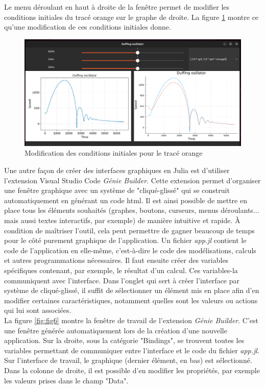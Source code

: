 \documentclass[a4paper, french, 12pt, titlepage]{article}
\begin{document}
Le menu déroulant en haut à droite de la fenêtre permet de modifier les conditions initiales du tracé orange sur le graphe de droite. 
La figure \ref{fig:fig5} montre ce qu'une modification de ces conditions initiales donne. \\

\begin{figure}[H]
  \includegraphics[width=\linewidth]{interactivewindow_4.png}
  \caption{Modification des conditions initiales pour le tracé orange}
  \label{fig:fig5}
\end{figure}

Une autre façon de créer des interfaces graphiques en Julia est d'utiliser l'extension Visual Studio Code \emph{Génie Builder}. 
Cette extension permet d'organiser une fenêtre graphique avec un système de "cliqué-glissé" qui se construit automatiquement en générant un code html.
 Il est ainsi possible de mettre en place tous les éléments souhaités (graphes, boutons, curseurs, menus déroulants... mais aussi textes interactifs, par exemple) de manière intuitive et rapide. 
 À condition de maîtriser l'outil, cela peut permettre de gagner beaucoup de temps pour le côté purement graphique de l'application. 
 Un fichier \emph{app.jl} contient le code de l'application en elle-même, c'est-à-dire le code des modélisations, calculs et autres programmations nécessaires.
  Il faut ensuite créer des variables spécifiques contenant, par exemple, le résultat d'un calcul.
   Ces variables-la communiquent avec l'interface.
    Dans l'onglet qui sert à créer l'interface par système de cliqué-glissé, il suffit de sélectionner un élément mis en place afin d'en modifier certaines caractéristiques, notamment quelles sont les valeurs ou actions qui lui sont associées. \\

La figure \ref{fig:fig6} montre la fenêtre de travail de l'extension \emph{Génie Builder}.
C'est une fenêtre générée automatiquement lors de la création d'une nouvelle application.
 Sur la droite, sous la catégorie "Bindings", se trouvent toutes les variables permettant de communiquer entre l'interface et le code du fichier \emph{app.jl}. 
 Sur l'interface de travail, le graphique (dernier élément, en bas) est sélectionné.
  Dans la colonne de droite, il est possible d'en modifier les propriétés, par exemple les valeurs prises dans le champ "Data". \\
\end{document}
